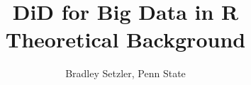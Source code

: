 \documentclass[usenames,dvipsnames]{beamer}
\title{\fontsize{15}{0}\selectfont DiD for Big Data in R\\\vspace{0.1cm}\fontsize{12}{30}\selectfont  Theoretical Background}
\author{\fontsize{12}{30}\selectfont  Bradley Setzler, Penn State}
\institute{\fontsize{6}{6}\selectfont \vspace{0.5cm} \textit{This draft compiled on: \today} }
\date{ }
\begin{document}
 
\frame{
\titlepage
}
 
 
 
%
%
%

 
\end{document}
